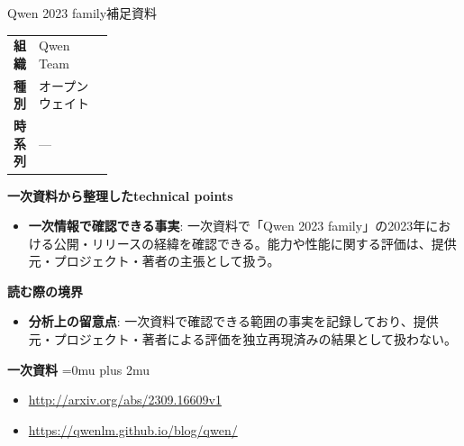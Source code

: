 \begin{technicalnote}{Qwen 2023 family}{補足資料}
\begingroup
\begin{tabularx}{\linewidth}{@{}>{\bfseries}p{0.22\linewidth}X@{}}
組織 & Qwen Team \\
種別 & オープンウェイト \\
時系列 & — \\
\end{tabularx}
\smallskip
{\bfseries 一次資料から整理したtechnical points}
\begin{itemize}[leftmargin=1.5em,itemsep=0.35em]
\item \textbf{一次情報で確認できる事実}: 一次資料で「Qwen 2023 family」の2023年における公開・リリースの経緯を確認できる。能力や性能に関する評価は、提供元・プロジェクト・著者の主張として扱う。
\end{itemize}
\begin{minipage}{\linewidth}
{\bfseries 読む際の境界}
\begin{itemize}[leftmargin=1.5em,itemsep=0.35em]
\item \textbf{分析上の留意点}: 一次資料で確認できる範囲の事実を記録しており、提供元・プロジェクト・著者による評価を独立再現済みの結果として扱わない。
\end{itemize}
\begin{samepage}
{\bfseries 一次資料}
\begingroup\sloppy
\Urlmuskip=0mu plus 2mu\relax
\begin{itemize}[leftmargin=1.5em,itemsep=0.25em]
\item {\scriptsize\url{http://arxiv.org/abs/2309.16609v1}}
\item {\scriptsize\url{https://qwenlm.github.io/blog/qwen/}}
\end{itemize}
\endgroup
\end{samepage}
\end{minipage}
\endgroup
\end{technicalnote}
\medskip
